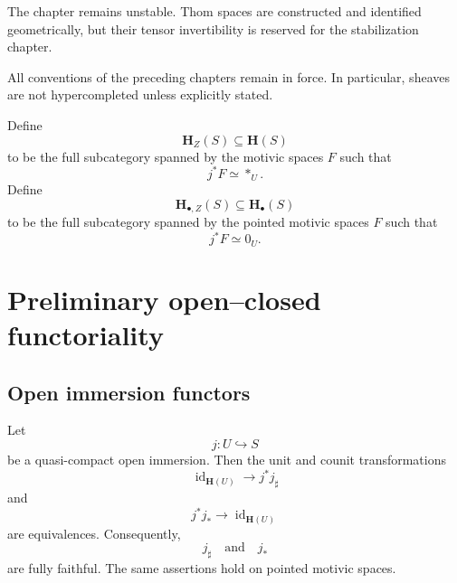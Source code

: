 The chapter remains unstable.  Thom spaces are constructed and
identified geometrically, but their tensor invertibility is reserved
for the stabilization chapter.

All conventions of the preceding chapters remain in force.  In
particular, sheaves are not hypercompleted unless explicitly stated.

\begin{definition}
\label{def:motivic-spaces-supported-on-closed}
Define
\[
    \mathbf H_Z(S)
    \subseteq
    \mathbf H(S)
\]
to be the full subcategory spanned by the motivic spaces \(F\) such that
\[
    j^*F
    \simeq
    *_U.
\]
Define
\[
    \mathbf H_{\bullet,Z}(S)
    \subseteq
    \mathbf H_\bullet(S)
\]
to be the full subcategory spanned by the pointed motivic spaces \(F\)
such that
\[
    j^*F
    \simeq
    0_U.
\]
\end{definition}

\section{Preliminary open--closed functoriality}
\label{sec:preliminary-open-closed-functoriality}

\subsection{Open immersion functors}

\begin{proposition}
\label{prop:open-immersion-full-faithfulness}
Let
\[
    j
    \colon
    U
    \hookrightarrow
    S
\]
be a quasi-compact open immersion.  Then the unit and counit
transformations
\[
    \operatorname{id}_{\mathbf H(U)}
    \longrightarrow
    j^*j_\sharp
\]
and
\[
    j^*j_*
    \longrightarrow
    \operatorname{id}_{\mathbf H(U)}
\]
are equivalences.  Consequently,
\[
    j_\sharp
    \quad\text{and}\quad
    j_*
\]
are fully faithful.  The same assertions hold on pointed motivic
spaces.
\end{proposition}

